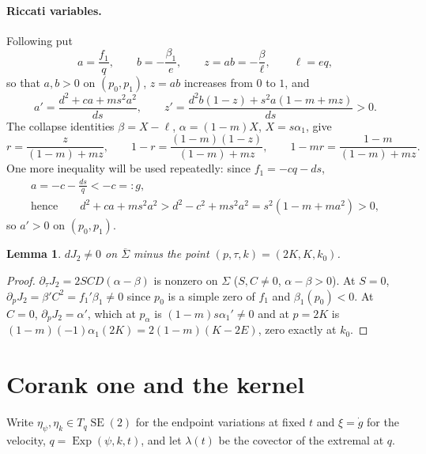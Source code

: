 \documentclass[11pt]{article}
\newtheorem{lemma}[theorem]{Lemma}
\theoremstyle{remark}
\newcommand{\SE}{\operatorname{SE}(2)}
\newcommand{\Exp}{\operatorname{Exp}}
\begin{document}
\paragraph{Riccati variables.}  Following \cite[Lemma 3.2]{SE2FirstConjugate}
put
\begin{equation}\label{eq:ab}
 a=\frac{f_1}q,\qquad b=-\frac{\beta_1}e,\qquad z=ab=-\frac\beta\ell,\qquad
 \ell=eq,
\end{equation}
so that $a,b>0$ on $(p_0,p_1)$, $z=ab$ increases from $0$ to $1$, and
\begin{equation}\label{eq:riccati}
 a'=\frac{d^2+ca+ms^2a^2}{ds},\qquad
 z'=\frac{d^2b(1-z)+s^2a(1-m+mz)}{ds}>0 .
\end{equation}
The collapse identities $\beta=X-\ell$, $\alpha=(1-m)X$, $X=s\alpha_1$, give
\begin{equation}\label{eq:r-in-z}
 r=\frac z{(1-m)+mz},\qquad 1-r=\frac{(1-m)(1-z)}{(1-m)+mz},\qquad
 1-mr=\frac{1-m}{(1-m)+mz}.
\end{equation}
One more inequality will be used repeatedly: since $f_1=-cq-ds$,
\begin{equation}\label{eq:a-below-g}
 \begin{gathered}
 a=-c-\frac{ds}q<-c=:g,\\
 \text{hence}\qquad d^2+ca+ms^2a^2>d^2-c^2+ms^2a^2=s^2(1-m+ma^2)>0,
 \end{gathered}
\end{equation}
so $a'>0$ on $(p_0,p_1)$.

\begin{lemma}\label{lem:sheet-smooth}
$dJ_2\ne0$ on $\overline\Sigma$ minus the point $(p,\tau,k)=(2K,K,k_0)$.
\end{lemma}
\begin{proof}
$\partial_\tau J_2=2SCD(\alpha-\beta)$ is nonzero on $\Sigma$ ($S,C\ne0$,
$\alpha-\beta>0$).  At $S=0$, $\partial_pJ_2=\beta'C^2=f_1'\beta_1\ne0$
since $p_0$ is a simple zero of $f_1$ and $\beta_1(p_0)<0$.  At $C=0$,
$\partial_pJ_2=\alpha'$, which at $p_\alpha$ is $(1-m)s\alpha_1'\ne0$ and
at $p=2K$ is $(1-m)(-1)\alpha_1(2K)=2(1-m)(K-2E)$, zero exactly at $k_0$.
\end{proof}

\section{Corank one and the kernel}\label{sec:kernel}

Write $\eta_\psi,\eta_k\in T_q\SE$ for the endpoint variations at fixed $t$
and $\xi=\dot g$ for the velocity, $q=\Exp(\psi,k,t)$, and let $\lambda(t)$
be the covector of the extremal at $q$.
\end{document}
